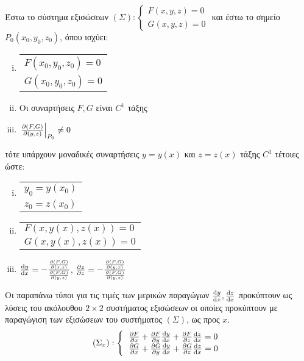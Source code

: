 Έστω το σύστημα εξισώσεων $(\Sigma):
	\begin{cases}
		F(x,y,z) = 0  \\
		G(x,y,z) = 0
	\end{cases}$
	και έστω το σημείο $ P_0(x_0,y_0,z_0) $, όπου ισχύει:
	\begin{enumerate}[(i)]
		\item  \begin{tabular}{l}
				$F(x_0,y_0,z_0) = 0$ \\
				$G(x_0,y_0,z_0) = 0$
			\end{tabular}
		\item Οι συναρτήσεις $ F, G $ είναι $ C^{1} $ τάξης 
		\item $ \left.\pdv{(F,G)}{(y,z)}\right|_{P_0} \neq 0 $ 
	\end{enumerate}
	τότε υπάρχουν μοναδικές συναρτήσεις $ y = y(x) $ και $ z = z(x) $ τάξης $ C^{1} $ τέτοιες
	ώστε:
	\begin{enumerate}[(i)]
		\item \begin{tabular}{l}
				$ y_0 = y(x_0) $ \\
				$ z_0 = z(x_0) $
			\end{tabular}
		\item \begin{tabular}{l}
				$ F(x,y(x),z(x)) = 0 $ \\
				$ G(x,y(x),z(x)) = 0 $
		\end{tabular}
	\item $ \dv{y}{x} = - \frac{\pdv{(F,G)}{(x,z)}}{\pdv{(F,G)}{(y,z)}} $, $ \pdv{z}{z} = -
		\frac{\pdv{(F,G)}{(y,x)}}{\pdv{(F,G)}{(y,z)}} $
	\end{enumerate}

\begin{rem}
	Οι παραπάνω τύποι για τις τιμές των μερικών παραγώγων $ \dv{y}{x}, \dv{z}{x}$ προκύπτουν ως
	λύσεις του ακόλουθου $ 2 \times 2 $ συστήματος εξισώσεων οι οποίες προκύπτουν με παραγώγιση των
	εξισώσεων του συστήματος $ (\Sigma) $, ως προς $x$.
	\renewcommand{\arraystretch}{2}
	\[
	\begin{aligned}
		(\Sigma_x): \left\{\begin{tabular}{l}
	$\pdv{F}{x} + \pdv{F}{y}\dv{y}{x} + \pdv{F}{z}\dv{z}{x} = 0$ \\
	$\pdv{G}{x} + \pdv{G}{y}\dv{y}{x} + \pdv{G}{z}\dv{z}{x} = 0$
	\end{tabular}
	\right.
\end{aligned}
	\]
\end{rem}

